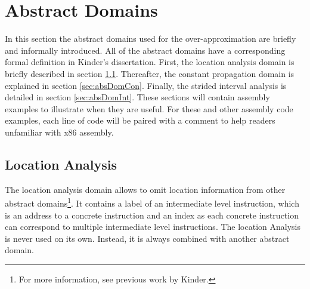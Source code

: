 \documentclass{kththesis}
\newcommand{\fbcomment}[1]{{#1}}
\renewcommand{\fbcomment}[1]{}
\begin{document}
\section{Abstract Domains}\label{sec:absDom}
\fbcomment{\color{red}Goal: Describe the abstract domains of Jakstab and what pros and cons come with each of them.}
In this section the abstract domains used for the over-approximation are briefly and informally introduced. All of the abstract domains have a corresponding formal definition in Kinder's dissertation\cite{Jakstab}. First, the location analysis domain is briefly described in section \ref{sec:absDomLoc}. Thereafter, the constant propagation domain is explained in section \ref{sec:absDomCon}. Finally, the strided interval analysis is detailed in section \ref{sec:absDomInt}. These sections will contain assembly examples to illustrate when they are useful. For these and other assembly code examples, each line of code will be paired with a comment to help readers unfamiliar with x86 assembly.

\subsection{Location Analysis}\label{sec:absDomLoc}

The location analysis domain allows to omit location information from other abstract domains\footnote{For more information, see previous work by Kinder\cite{Jakstab}.}. It contains a label of an intermediate level instruction, which is an address to a concrete instruction and an index as each concrete instruction can correspond to multiple intermediate level instructions. The location Analysis is never used on its own. Instead, it is always combined with another abstract domain.
\end{document}
